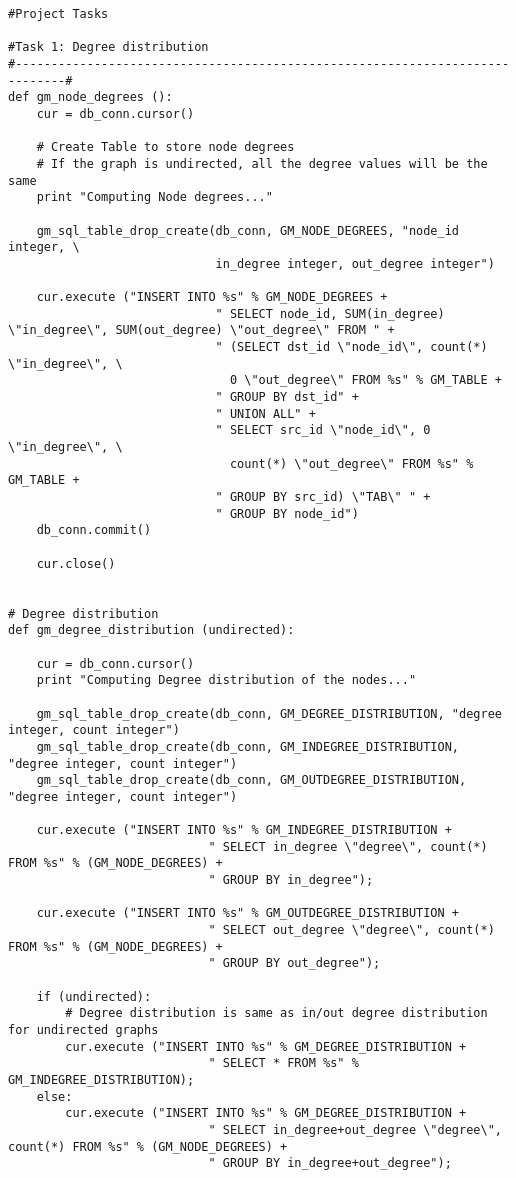 \begin{lstlisting}
#Project Tasks

#Task 1: Degree distribution
#-----------------------------------------------------------------------------#
def gm_node_degrees ():
    cur = db_conn.cursor()

    # Create Table to store node degrees
    # If the graph is undirected, all the degree values will be the same
    print "Computing Node degrees..."

    gm_sql_table_drop_create(db_conn, GM_NODE_DEGREES, "node_id integer, \
                             in_degree integer, out_degree integer")

    cur.execute ("INSERT INTO %s" % GM_NODE_DEGREES +
                             " SELECT node_id, SUM(in_degree) \"in_degree\", SUM(out_degree) \"out_degree\" FROM " +
                             " (SELECT dst_id \"node_id\", count(*) \"in_degree\", \
                               0 \"out_degree\" FROM %s" % GM_TABLE +
                             " GROUP BY dst_id" +
                             " UNION ALL" +
                             " SELECT src_id \"node_id\", 0 \"in_degree\", \
                               count(*) \"out_degree\" FROM %s" % GM_TABLE +
                             " GROUP BY src_id) \"TAB\" " +
                             " GROUP BY node_id")
    db_conn.commit()

    cur.close()


# Degree distribution
def gm_degree_distribution (undirected):

    cur = db_conn.cursor()
    print "Computing Degree distribution of the nodes..."

    gm_sql_table_drop_create(db_conn, GM_DEGREE_DISTRIBUTION, "degree integer, count integer")
    gm_sql_table_drop_create(db_conn, GM_INDEGREE_DISTRIBUTION, "degree integer, count integer")
    gm_sql_table_drop_create(db_conn, GM_OUTDEGREE_DISTRIBUTION, "degree integer, count integer")

    cur.execute ("INSERT INTO %s" % GM_INDEGREE_DISTRIBUTION +
                            " SELECT in_degree \"degree\", count(*) FROM %s" % (GM_NODE_DEGREES) +
                            " GROUP BY in_degree");

    cur.execute ("INSERT INTO %s" % GM_OUTDEGREE_DISTRIBUTION +
                            " SELECT out_degree \"degree\", count(*) FROM %s" % (GM_NODE_DEGREES) +
                            " GROUP BY out_degree");

    if (undirected):
        # Degree distribution is same as in/out degree distribution for undirected graphs
        cur.execute ("INSERT INTO %s" % GM_DEGREE_DISTRIBUTION +
                            " SELECT * FROM %s" % GM_INDEGREE_DISTRIBUTION);
    else:
        cur.execute ("INSERT INTO %s" % GM_DEGREE_DISTRIBUTION +
                            " SELECT in_degree+out_degree \"degree\", count(*) FROM %s" % (GM_NODE_DEGREES) +
                            " GROUP BY in_degree+out_degree");


\end{lstlisting}
